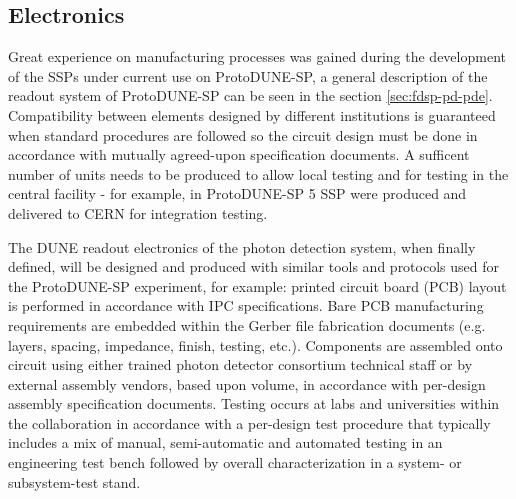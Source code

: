 \subsection{Electronics}
\label{sec:fdsp-pd-assy-pde}

Great experience on manufacturing processes was gained during the development of the SSPs under current use on ProtoDUNE-SP, a general description of the readout system of ProtoDUNE-SP can be seen in the section \ref{sec:fdsp-pd-pde}. Compatibility between elements designed by different institutions is guaranteed when standard procedures are followed so the circuit design must be done in accordance with mutually agreed-upon specification documents.  A sufficent  number of units needs to be produced to allow local testing and for testing in the central facility - for example, in ProtoDUNE-SP \num{5} SSP were produced and delivered to CERN for integration testing.

The DUNE readout electronics of the photon detection system, when finally defined, will be designed and produced with similar tools and protocols used for the ProtoDUNE-SP experiment, for example: printed circuit board (PCB) layout is performed in accordance with IPC specifications. Bare PCB manufacturing requirements are embedded within the Gerber file fabrication documents (e.g. layers, spacing, impedance, finish, testing, etc.). Components are assembled onto circuit using either trained photon detector consortium technical staff or by external assembly vendors, based upon volume, in accordance with per-design assembly specification documents. Testing occurs at labs and universities within the collaboration in accordance with a per-design test procedure that typically includes a mix of manual, semi-automatic and automated testing in an engineering test bench followed by overall characterization in a system- or subsystem-test stand.


